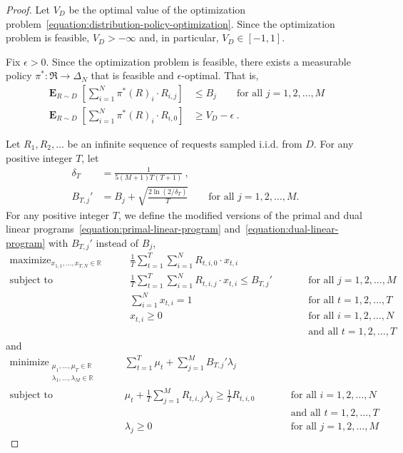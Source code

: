 \documentclass[12pt]{article}
\newcommand{\R}{\mathbb{R}}
\newcommand{\Requests}{\mathfrak{R}}
\DeclareMathOperator*{\Exp}{\mathbf{E}}
\DeclareMathOperator*{\maximize}{maximize}
\DeclareMathOperator*{\minimize}{minimize}
\DeclareMathOperator*{\subjectto}{subject\ to}
\theoremstyle{definition}
\begin{document}
\begin{proof}
Let $V_D$ be the optimal value of the optimization
problem~\eqref{equation:distribution-policy-optimization}. Since the
optimization problem is feasible, $V_D > -\infty$ and, in particular, $V_D \in
[-1,1]$.

Fix $\epsilon > 0$. Since the optimization problem is feasible, there exists a
measurable policy $\pi^*: \Requests \to \Delta_N$ that is feasible and
$\epsilon$-optimal. That is,
\begin{align}
\label{inequality:optimal-policy-feasibility}
\Exp_{R \sim D} \left[ \sum_{i=1}^N \pi^*(R)_i \cdot R_{i,j} \right] & \le B_j \qquad \text{for all $j=1,2,\dots,M$} \\
\label{inequality:optimal-policy-optimality}
\Exp_{R \sim D} \left[ \sum_{i=1}^N \pi^*(R)_i \cdot R_{i,0} \right] & \ge V_D - \epsilon \: .
\end{align}

Let $R_1, R_2, \dots$ be an infinite sequence of requests sampled i.i.d. from
$D$. For any positive integer $T$, let
\begin{align*}
\delta_T & = \frac{1}{5(M+1)T(T+1)} \: , \\
B_{T,j}' & = B_j + \sqrt{ \frac{2\ln(2/\delta_T)}{T}} \qquad \text{for all $j=1,2,\dots,M$.}
\end{align*}
For any positive integer $T$, we define the modified versions of the primal and
dual linear programs~\eqref{equation:primal-linear-program}
and~\eqref{equation:dual-linear-program} with $B_{T,j}'$ instead of $B_j$,
\begin{equation}
\label{equation:primal-linear-program-modified}
\begin{aligned}
\maximize_{x_{1,1}, \dots, x_{T,N} \in \R} \qquad & \frac{1}{T} \sum_{t=1}^T \sum_{i=1}^N R_{t,i,0} \cdot x_{t,i} \\
\subjectto \qquad & \frac{1}{T} \sum_{t=1}^T \sum_{i=1}^N R_{t,i,j} \cdot x_{t,i} \le B_{T,j}' && \qquad \text{for all $j=1,2,\dots,M$} \\
& \sum_{i=1}^N x_{t,i} = 1 && \qquad \text{for all $t=1,2,\dots,T$} \\
& x_{t,i} \ge 0 && \qquad \text{for all $i=1,2,\dots,N$} \\
& && \qquad \text{and all $t=1,2,\dots,T$}
\end{aligned}
\end{equation}
and
\begin{equation}
\label{equation:dual-linear-program-modified}
\begin{aligned}
\minimize_{\substack{\mu_1, \dots, \mu_T \in \R \\ \lambda_1, \dots, \lambda_M \in \R}} \qquad & \sum_{t=1}^T \mu_t + \sum_{j=1}^M B_{T,j}' \lambda_j \\
\subjectto \qquad
& \mu_t + \frac{1}{T} \sum_{j=1}^M R_{t,i,j} \lambda_j  \ge \frac{1}{T} R_{t,i,0} && \qquad \text{for all $i=1,2,\dots,N$} \\
& && \qquad \text{and all $t=1,2,\dots,T$} \\
& \lambda_j \ge 0 && \qquad \text{for all $j=1,2,\dots,M$}
\end{aligned}
\end{equation}


\end{proof}
\end{document}
